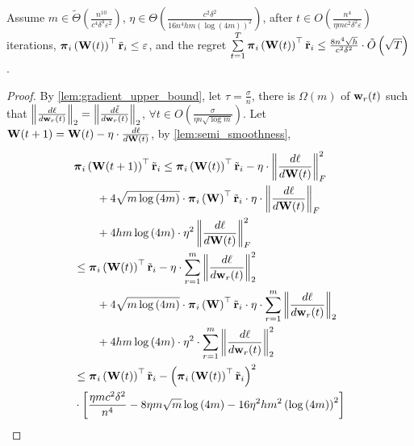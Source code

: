 \begin{thm}
\label{thm:main_result_1}
    Assume $m \in \tilde{\Theta}\left( \frac{n^{10}}{c^4 \delta^4 \varepsilon^2} \right)$, $\eta \in \Theta\left( \frac{c^2 \delta^2}{16 n^4 h m \left( \log{\left(4m\right)} \right)^2} \right)$, after $t \in O\left( \frac{n^4}{\eta m c^2 \delta^2 \varepsilon} \right)$ iterations, ${\boldsymbol{\pi}}_i\left( {\mathbf{W}}(t) \right)^\top {\tilde{\mathbf{r}}}_i \le \varepsilon$, and the regret $\sum\limits_{t=1}^{T}{ {\boldsymbol{\pi}}_i\left( {\mathbf{W}}(t) \right)^\top {\tilde{\mathbf{r}}}_i } \le  \frac{8 n^4 \sqrt{h}}{c^2 \delta^2} \cdot \tilde{O}\left( \sqrt{T} \right)$.
\end{thm}
\begin{proof}
    By \cref{lem:gradient_upper_bound}, let $\tau = \frac{\sigma}{n}$, there is $\Omega\left( m \right)$ of ${\mathbf{w}}_r(t)$ such that $\left\| \frac{d\ell}{d {\mathbf{w}}_r(t)} \right\|_2 = \left\| \frac{d\tilde{\ell}}{d {\mathbf{w}}_r(t)} \right\|_2$, $\forall t \in O\left( \frac{\sigma}{\eta n \sqrt{\log{m}}} \right)$. Let ${\mathbf{W}}(t+1) = {\mathbf{W}}(t) - \eta \cdot \frac{d \ell}{d {\mathbf{W}}(t)}$, by \cref{lem:semi_smoothness},
\begin{equation*}
\begin{split}
    &\rvpi_i\left( \rmW(t+1) \right)^\top \rvtilder_i \le \rvpi_i\left( \rmW(t) \right)^\top \rvtilder_i - \eta \cdot \left\| \frac{d \ell}{d \rmW(t)} \right\|_F^2 \\
    &\qquad + 4 \sqrt{m \log{\left(4m\right)}} \cdot \rvpi_i\left( \rmW \right)^\top \rvtilder_i \cdot \eta \cdot \left\| \frac{d \ell}{d \rmW(t)} \right\|_F \\
    &\qquad + 4 h m \log{\left(4m\right)} \cdot \eta^2 \left\| \frac{d \ell}{d \rmW(t)} \right\|_F^2 \\
    &\le \rvpi_i\left( \rmW(t) \right)^\top \rvtilder_i - \eta \cdot \sum\limits_{r=1}^{m}{ \left\| \frac{d\ell}{d \rvw_r(t)} \right\|_2^2 } \\
    &\qquad + 4 \sqrt{m \log{\left(4m\right)}} \cdot \rvpi_i\left( \rmW \right)^\top \rvtilder_i \cdot \eta \cdot \sum\limits_{r=1}^{m}{ \left\| \frac{d\ell}{d \rvw_r(t)} \right\|_2 } \\
    &\qquad + 4 h m \log{\left(4m\right)} \cdot \eta^2 \cdot \sum\limits_{r=1}^{m}{ \left\| \frac{d\ell}{d \rvw_r(t)} \right\|_2^2 } \\
    &\le \rvpi_i\left( \rmW(t) \right)^\top \rvtilder_i - \left( \rvpi_i\left( \rmW(t) \right)^\top \rvtilder_i \right)^2 \\
    &\cdot \left[ \frac{\eta m c^2 \delta^2}{n^4} - 8 \eta m \sqrt{m} \log{\left(4m\right)} - 16 \eta^2 h m^2 \left( \log{\left(4m\right)} \right)^2 \right] \\

\end{split}
\end{equation*}
\end{proof}
